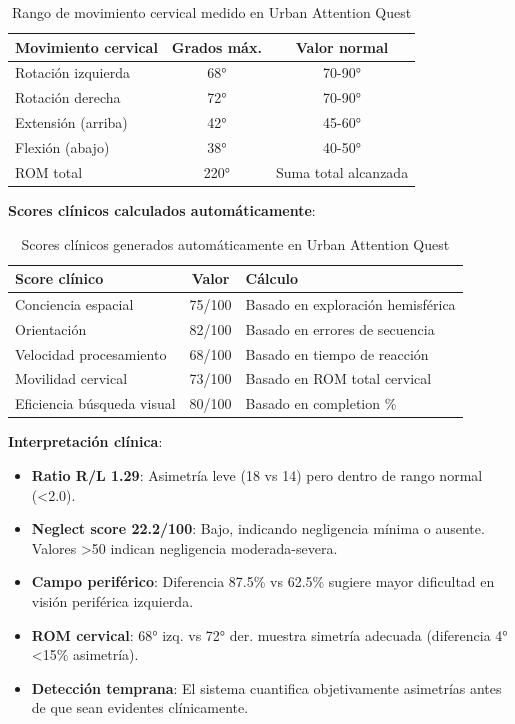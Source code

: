 \begin{table}[h]
\centering
\begin{tabular}{|l|c|c|}
\hline
\textbf{Movimiento cervical} & \textbf{Grados máx.} & \textbf{Valor normal} \\ \hline
Rotación izquierda & 68° & 70-90° \\ \hline
Rotación derecha & 72° & 70-90° \\ \hline
Extensión (arriba) & 42° & 45-60° \\ \hline
Flexión (abajo) & 38° & 40-50° \\ \hline
ROM total & 220° & Suma total alcanzada \\ \hline
\end{tabular}
\caption{Rango de movimiento cervical medido en Urban Attention Quest}
\label{tab:cervical-rom}
\end{table}

\textbf{Scores clínicos calculados automáticamente}:

\begin{table}[h]
\centering
\begin{tabular}{|l|c|l|}
\hline
\textbf{Score clínico} & \textbf{Valor} & \textbf{Cálculo} \\ \hline
Conciencia espacial & 75/100 & Basado en exploración hemisférica \\ \hline
Orientación & 82/100 & Basado en errores de secuencia \\ \hline
Velocidad procesamiento & 68/100 & Basado en tiempo de reacción \\ \hline
Movilidad cervical & 73/100 & Basado en ROM total cervical \\ \hline
Eficiencia búsqueda visual & 80/100 & Basado en completion \% \\ \hline
\end{tabular}
\caption{Scores clínicos generados automáticamente en Urban Attention Quest}
\label{tab:city-clinical-scores}
\end{table}

\textbf{Interpretación clínica}:
\begin{itemize}
    \item \textbf{Ratio R/L 1.29}: Asimetría leve (18 vs 14) pero dentro de rango normal (<2.0).
    \item \textbf{Neglect score 22.2/100}: Bajo, indicando negligencia mínima o ausente. Valores >50 indican negligencia moderada-severa.
    \item \textbf{Campo periférico}: Diferencia 87.5\% vs 62.5\% sugiere mayor dificultad en visión periférica izquierda.
    \item \textbf{ROM cervical}: 68° izq. vs 72° der. muestra simetría adecuada (diferencia 4° <15\% asimetría).
    \item \textbf{Detección temprana}: El sistema cuantifica objetivamente asimetrías antes de que sean evidentes clínicamente.
\end{itemize}

